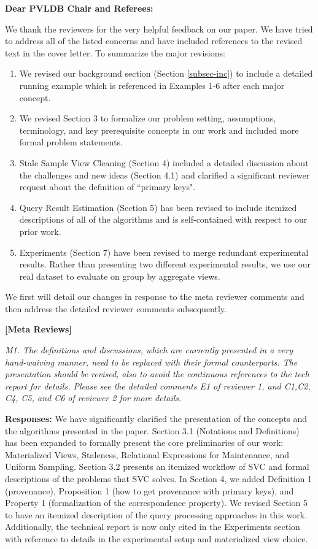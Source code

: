 {\noindent \normalsize \bf Dear PVLDB Chair and Referees: }

\vspace{.5em}
We thank the reviewers for the very helpful feedback on our paper. We have tried to address all of the listed concerns and have included references to the revised text in the cover letter. 
To summarize the major revisions:
\begin{enumerate}
\item We revised our background section (Section \ref{subsec-inc}) to include a detailed running example which is referenced in Examples 1-6 after each major concept.
\item We revised Section 3 to formalize our problem setting, assumptions, terminology, and key prerequisite concepts in our work and included more formal problem statements.
\item Stale Sample View Cleaning (Section 4) included a detailed discussion about the challenges and new ideas (Section 4.1) and clarified a significant reviewer request about the definition of ``primary keys".
\item Query Result Estimation (Section 5) has been revised to include itemized descriptions of all of the algorithms and is self-contained with respect to our prior work.
\item Experiments (Section 7) have been revised to merge redundant experimental results. Rather than presenting two different experimental results, we use our real dataset to evaluate \svc on group by aggregate views.
\end{enumerate}
We first will detail our changes in response to the meta reviewer comments and then address the detailed reviewer comments subsequently.

\vspace{2em}
\noindent\textbf{[Meta Reviews]}
\vspace{1em}

\emph{M1. The definitions and discussions, which are currently presented in a very hand-waiving manner, need to be replaced with their formal counterparts. The presentation should be revised, also to avoid the continuous references to the tech report for details. Please see the detailed comments E1 of reviewer 1, and C1,C2, C4, C5, and C6 of reviewer 2 for more details.}
\vspace{.25em}

{\bf Responses:} We have significantly clarified the presentation of the concepts and the algorithms presented in the paper. Section 3.1 (Notations and Definitions) has been expanded to formally present the core preliminaries of our work: Materialized Views, Staleness, Relational Expressions for Maintenance, and Uniform Sampling. Section 3.2 presents an itemized workflow of SVC and formal descriptions of the problems that SVC solves. In Section 4, we added Definition 1 (provenance), Proposition 1 (how to get provenance with primary keys), and Property 1 (formalization of the correspondence property). We revised Section 5 to have an itemized description of the query processing approaches in this work.  Additionally, the technical report is now only cited in the Experiments section with reference to details in the experimental setup and materialized view choice.

